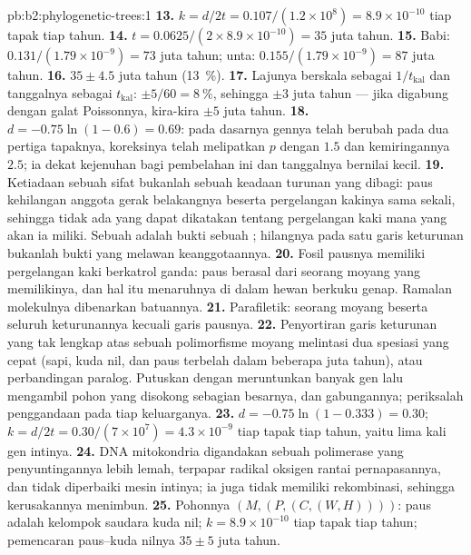 \begin{solution}{pb:b2:phylogenetic-trees:1}
\textbf{13.} $k = d/2t = 0.107/(1.2\times 10^{8}) = 8.9\times 10^{-10}$
tiap tapak tiap tahun.
\textbf{14.} $t = 0.0625/(2\times 8.9\times 10^{-10}) = 35$ juta
tahun.
\textbf{15.} Babi: $0.131/(1.79\times 10^{-9}) = 73$ juta tahun;
unta: $0.155/(1.79\times 10^{-9}) = 87$ juta tahun.
\textbf{16.} $35 \pm 4.5$ juta tahun (\qty{13}{\%}).
\textbf{17.} Lajunya berskala sebagai $1/t_{\text{kal}}$ dan tanggalnya
sebagai $t_{\text{kal}}$: $\pm 5/60 = \qty{8}{\%}$, sehingga $\pm 3$
juta tahun --- jika digabung dengan galat Poissonnya, kira-kira $\pm 5$
juta tahun.
\textbf{18.} $d = -0.75\ln(1 - 0.6) = 0.69$: pada dasarnya gennya telah
berubah pada dua pertiga tapaknya, koreksinya telah melipatkan $p$
dengan $1.5$ dan kemiringannya $2.5$; ia dekat kejenuhan bagi
pembelahan ini dan tanggalnya bernilai kecil.
\textbf{19.} Ketiadaan sebuah sifat bukanlah sebuah keadaan turunan
yang dibagi: paus kehilangan anggota gerak belakangnya beserta
pergelangan kakinya sama sekali, sehingga tidak ada yang dapat
dikatakan tentang pergelangan kaki mana yang akan ia miliki. Sebuah
 adalah bukti sebuah ; hilangnya pada satu garis
keturunan bukanlah bukti yang melawan keanggotaannya.
\textbf{20.} Fosil pausnya memiliki pergelangan kaki berkatrol ganda:
paus berasal dari seorang moyang yang memilikinya, dan hal itu
menaruhnya di dalam hewan berkuku genap. Ramalan molekulnya dibenarkan
batuannya.
\textbf{21.} Parafiletik: seorang moyang beserta seluruh keturunannya
kecuali garis pausnya.
\textbf{22.} Penyortiran garis keturunan yang tak lengkap atas sebuah
polimorfisme moyang melintasi dua spesiasi yang cepat (sapi, kuda nil,
dan paus terbelah dalam beberapa juta tahun), atau perbandingan
paralog. Putuskan dengan meruntunkan banyak gen lalu mengambil pohon
yang disokong sebagian besarnya, dan gabungannya; periksalah
penggandaan pada tiap keluarganya.
\textbf{23.} $d = -0.75\ln(1 - 0.333) = 0.30$; $k = d/2t =
0.30/(7\times 10^{7}) = 4.3\times 10^{-9}$ tiap tapak tiap tahun, yaitu
lima kali gen intinya.
\textbf{24.} DNA mitokondria digandakan sebuah polimerase yang
penyuntingannya lebih lemah, terpapar radikal oksigen rantai
pernapasannya, dan tidak diperbaiki mesin intinya; ia juga tidak
memiliki rekombinasi, sehingga kerusakannya menimbun.
\textbf{25.} Pohonnya $(M,(P,(C,(W,H))))$: paus adalah kelompok saudara
kuda nil; $k = 8.9\times 10^{-10}$ tiap tapak tiap tahun; pemencaran
paus--kuda nilnya $35 \pm 5$ juta tahun.
\end{solution}
